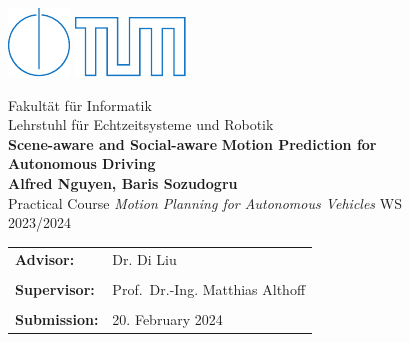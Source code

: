 \begin{figure}[!h]

  \includegraphics{images/IN.pdf} \hfil \includegraphics{images/tumlogo.pdf}
 
  \vspace*{1cm}
  {\large \textsf{Fakult{\"a}t f{\"u}r Informatik}}\\
  {\large \textsf{Lehrstuhl f{\"u}r Echtzeitsysteme und Robotik}}\\
   

  \vspace*{5cm}
%
%
%
%
  {\color{tumblue} \Huge \bf \textsf{Scene-aware and Social-aware}}
  \vspace*{0.5cm}
  {\color{tumblue} \Huge \bf \textsf{Motion Prediction for Autonomous Driving}}\\  %

  \vspace*{1cm}
%
%
%
% 
  {\Large \bf \textsf{Alfred Nguyen, Baris Sozudogru}}\\   %
 
  \vspace*{8cm}
  {\Large \textsf{Practical Course \emph{Motion Planning for Autonomous Vehicles} WS 2023/2024}}\\
 
  \vspace*{1cm} 
  \begin{tabular}{ll}
%
%
%
%
    {\Large \bf \textsf{Advisor:}} &
    {\Large \textsf{Dr. Di Liu}}\\                  %
    \\

    {\Large \bf \textsf{Supervisor:}} &
    {\Large \textsf{Prof.~Dr.-Ing. Matthias Althoff}}\\
    \\

%
%
%
%
    {\Large \bf \textsf{Submission:}} &
    {\Large \textsf{20. February 2024}}

  \end{tabular}
  
\end{figure}
